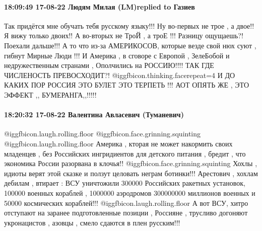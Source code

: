  
 
 
 
 

\paragraph{18:09:49 17-08-22 Людям Милая (LM)replied to Газиев}

\obeycr
Так придётся мне обучать тебя русскому языку!!!
Ну во-первых не трое , а двое!! Я вижу только двоих!!
А во-вторых не
ТроЙ , а троЕ !!! Разницу ощущаешь?!
Поехали дальше!!!
А то что из-за АМЕРИКОСОВ, которые везде свой нюх суют , гибнут Мирные Люди !!!
И Америка , в сговоре с Европой , ЗелеБобой и недружественным странами , Ополчились на РОССИЮ!!!! ТАК ГДЕ ЧИСЛЕНОСТЬ ПРЕВОСХОДИТ?! @igg{fbicon.thinking.face}{repeat=4}  И ДО КАКИХ ПОР РОССИЯ ЭТО БУЛЕТ ЭТО ТЕРПЕТЬ !!!
АОТ ОПЯТЬ ЖЕ , ЭТО ЭФФЕКТ ,, БУМЕРАНГА,,!!!!!
\restorecr


\paragraph{18:20:32 17-08-22 Валентина Авласевич (Туманевич)}

\obeycr
 @igg{fbicon.laugh.rolling.floor}  @igg{fbicon.face.grinning.squinting}  @igg{fbicon.laugh.rolling.floor}  Америка , кторая не может накормить своих младенцев , без Российских ингридиентов для детского питания , бредит , что экономика России разорвана в клочья!! @igg{fbicon.face.grinning.squinting}  Хохлы , идиоты верят этой сказке и ползут целовать неграм ботинки!!!
Арестович , хохлам дебилам , втирает : ВСУ уничтожили 300000 Российских ракетных установок, 100000 военных кораблей , 1000000 аэродромов 300000000 миллионов военных и 50000 космических кораблей!!! @igg{fbicon.laugh.rolling.floor}  А вот ВСУ, хитро отступают на заранее подготовленные позиции , Россияне , трусливо догоняют укронацистов , азовцы , смело сдаются в плен русским!!!
\restorecr

